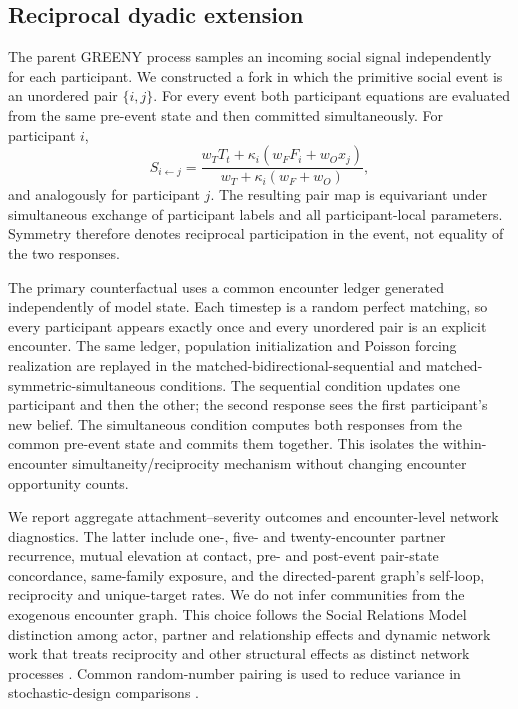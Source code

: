 \subsection{Reciprocal dyadic extension}
The parent GREENY process samples an incoming social signal independently for each participant. We constructed a fork in which the primitive social event is an unordered pair $\{i,j\}$. For every event both participant equations are evaluated from the same pre-event state and then committed simultaneously. For participant $i$,
\begin{equation}
S_{i\leftarrow j}=\frac{w_TT_t+\kappa_i(w_FF_i+w_Ox_j)}{w_T+\kappa_i(w_F+w_O)},
\end{equation}
and analogously for participant $j$. The resulting pair map is equivariant under simultaneous exchange of participant labels and all participant-local parameters. Symmetry therefore denotes reciprocal participation in the event, not equality of the two responses.

The primary counterfactual uses a common encounter ledger generated independently of model state. Each timestep is a random perfect matching, so every participant appears exactly once and every unordered pair is an explicit encounter. The same ledger, population initialization and Poisson forcing realization are replayed in the matched-bidirectional-sequential and matched-symmetric-simultaneous conditions. The sequential condition updates one participant and then the other; the second response sees the first participant's new belief. The simultaneous condition computes both responses from the common pre-event state and commits them together. This isolates the within-encounter simultaneity/reciprocity mechanism without changing encounter opportunity counts.

We report aggregate attachment--severity outcomes and encounter-level network diagnostics. The latter include one-, five- and twenty-encounter partner recurrence, mutual elevation at contact, pre- and post-event pair-state concordance, same-family exposure, and the directed-parent graph's self-loop, reciprocity and unique-target rates. We do not infer communities from the exogenous encounter graph. This choice follows the Social Relations Model distinction among actor, partner and relationship effects \citep{Cook1984,An2023} and dynamic network work that treats reciprocity and other structural effects as distinct network processes \citep{Snijders2017}. Common random-number pairing is used to reduce variance in stochastic-design comparisons \citep{YangNelson1991}.
